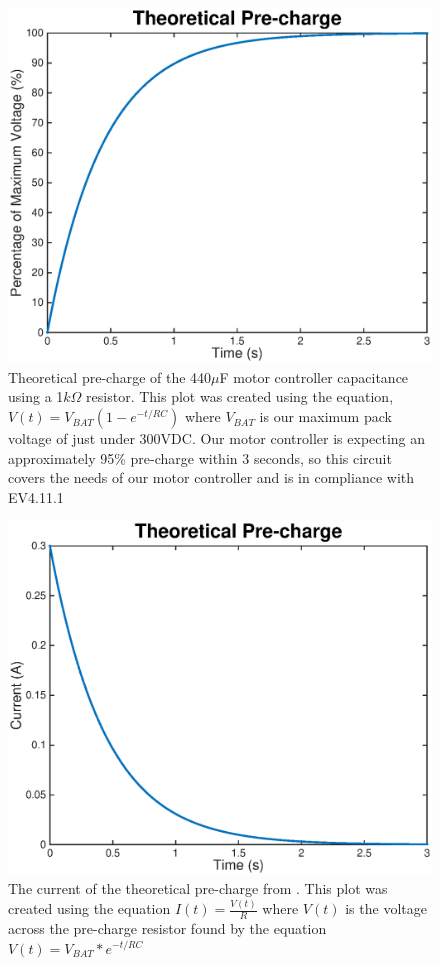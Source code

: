 \documentclass{article}
\begin{document}
\begin{figure}[H]
    \centering
    \includegraphics[width = 0.8 \textwidth]{precharge_voltage}
    \caption{Theoretical pre-charge of the 440$\mu$F motor controller capacitance using a 1$k\Omega$ resistor. This plot was created using the equation, $V(t) = V_{BAT}(1 - e^{-t/RC})$ where $V_{BAT}$ is our maximum pack voltage of just under 300VDC. Our motor controller is expecting an approximately 95\% pre-charge within 3 seconds, so this circuit covers the needs of our motor controller and is in compliance with EV4.11.1 }
    \label{fig:precharge_voltage}
\end{figure}

\begin{figure}[H]
    \centering
    \includegraphics[width = 0.8 \textwidth]{precharge_current}
    \caption{The current of the theoretical pre-charge from . This plot was created using the equation $I(t) = \frac{V(t)}{R}$ where $V(t)$ is the voltage across the pre-charge resistor found by the equation $V(t) = V_{BAT} * e^{-t/RC}$ }
    \label{fig:precharge_current}
\end{figure}
\end{document}
